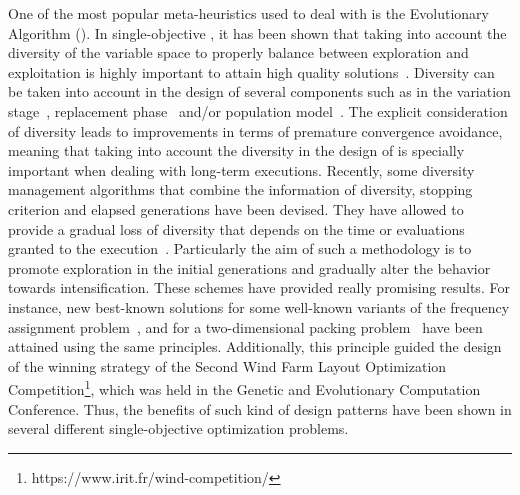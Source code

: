 One of the most popular meta-heuristics used to deal with \MOPS{} is the Evolutionary Algorithm (\EA{}).
%
In single-objective \EAS{}, it has been shown that taking into account the diversity of the variable space
to properly balance between exploration and exploitation is highly important to attain high quality 
solutions~\cite{Joel:BALANCE_DIVERSITY}.
%
Diversity can be taken into account in the design of several components such as in the variation 
stage~\cite{Joel:FUZZY_ADAPTIVE_GA,Joel:CROSSOVER_DIVERSITY}, replacement phase~\cite{Joel:MULTI_DYNAMIC} 
and/or population model~\cite{Joel:SAWTOOTH}.
%
The explicit consideration of diversity leads to improvements in terms of premature convergence avoidance, 
meaning that taking into account the diversity in the design of \EAS{} is specially important when dealing 
with long-term executions.
%
Recently, some diversity management algorithms that combine the information of diversity, stopping criterion and elapsed 
generations have been devised.
%
They have allowed to provide a gradual loss of diversity that depends on the time or evaluations granted to the 
execution~\cite{Joel:MULTI_DYNAMIC}.
%
Particularly the aim of such a methodology is to promote exploration in the initial generations and gradually alter the 
behavior towards intensification.
%
These schemes have provided really promising results.
%
For instance, new best-known solutions for some well-known variants of the frequency assignment problem~\cite{Segura:17},
and for a two-dimensional packing problem~\cite{Joel:MULTI_DYNAMIC} have been attained using the same principles.
%
Additionally, this principle guided the design of the winning strategy of the Second Wind Farm Layout Optimization 
Competition\footnote{https://www.irit.fr/wind-competition/}, which was held in the Genetic and Evolutionary 
Computation Conference.
%
Thus, the benefits of such kind of design patterns have been shown in several different single-objective optimization problems.

